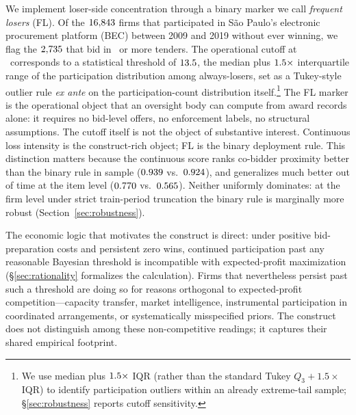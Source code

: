 We implement loser-side concentration through a binary marker
we call \emph{frequent losers} (FL). Of the $16{,}843$ firms
that participated in São Paulo's electronic procurement
platform (BEC) between 2009 and 2019 without ever winning, we
flag the $2{,}735$ that bid in \valThreshold\ or more tenders.
The operational cutoff at \valThreshold\ corresponds to a
statistical threshold of $13.5$, the
median plus $1.5\times$ interquartile range of the participation
distribution among always-losers, set as a Tukey-style outlier
rule \emph{ex ante} on the participation-count distribution
itself.\footnote{We use median plus $1.5\times$ IQR (rather
than the standard Tukey $Q_3 + 1.5\times$ IQR) to identify
participation outliers within an already extreme-tail
sample; \S\ref{sec:robustness} reports cutoff sensitivity.}
The FL marker is the operational object that an oversight
body can compute from award records alone: it requires no
bid-level offers, no enforcement labels, no structural
assumptions. The cutoff itself is not the object of
substantive interest. Continuous loss intensity is the
construct-rich object; FL is the binary deployment rule. This
distinction matters because the continuous score ranks
co-bidder proximity better than the binary rule in sample
($0.939$ vs.\ $0.924$), and generalizes much
better out of time at the item level ($0.770$
vs.\ $0.565$). Neither uniformly dominates: at
the firm level under strict train-period truncation the
binary rule is marginally more robust
(Section~\ref{sec:robustness}).

The economic logic that motivates the construct is direct:
under positive bid-preparation costs and persistent zero wins,
continued participation past any reasonable Bayesian threshold
is incompatible with expected-profit maximization
(\S\ref{sec:rationality} formalizes the calculation). Firms
that nevertheless persist past such a threshold are doing so
for reasons orthogonal to expected-profit competition---capacity
transfer, market intelligence, instrumental participation in
coordinated arrangements, or systematically misspecified
priors. The construct does not distinguish among these
non-competitive readings; it captures their shared empirical
footprint.

